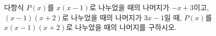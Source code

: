 다항식 $P(x)$를 $x(x-1)$로 나누었을 때의 나머지가 $-x+3$이고, $(x-1)(x+2)$로 나누었을 때의 나머지가 $3x-1$일 때, $P(x)$를 $x(x-1)(x+2)$로 나누었을 때의 나머지를 구하시오.
